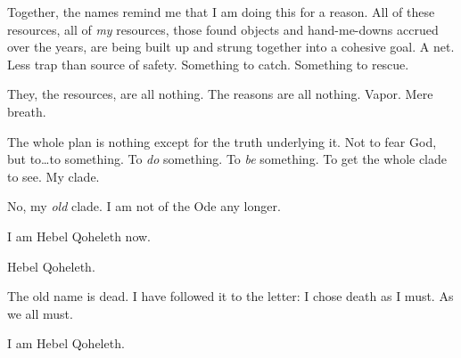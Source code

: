 Together, the names remind me that I am doing this for a reason. All of these resources, all of \emph{my} resources, those found objects and hand-me-downs accrued over the years, are being built up and strung together into a cohesive goal. A net. Less trap than source of safety. Something to catch. Something to rescue.

They, the resources, are all nothing. The reasons are all nothing. Vapor. Mere breath.

The whole plan is nothing except for the truth underlying it. Not to fear God, but to\ldots{}to something. To \emph{do} something. To \emph{be} something. To get the whole clade to see. My clade.

No, my \emph{old} clade. I am not of the Ode any longer.

I am Hebel Qoheleth now.

Hebel Qoheleth.

The old name is dead. I have followed it to the letter: I chose death as I must. As we all must.

I am Hebel Qoheleth.
